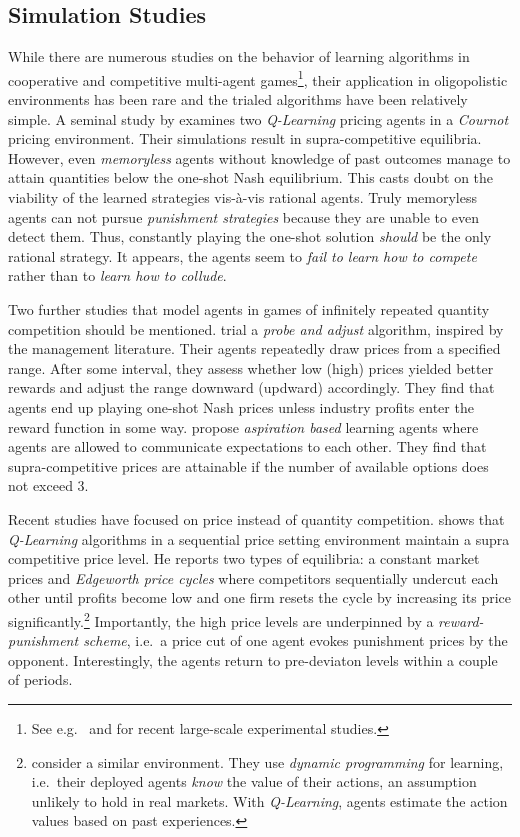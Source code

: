 \subsection{Simulation Studies}\label{simulation_studies}

While there are numerous studies on the behavior of learning algorithms in cooperative and competitive multi-agent games\footnote{See e.g.\ \textcite{leibo_multi-agent_2017} and \textcite{crandall_cooperating_2018} for recent large-scale experimental studies.}, their application in oligopolistic environments has been rare and the trialed algorithms have been relatively simple. A seminal study by \textcite{waltman_q-learning_2008} examines two \emph{Q-Learning} pricing agents in a \emph{Cournot} pricing environment. Their simulations result in supra-competitive equilibria. However, even \emph{memoryless} agents without knowledge of past outcomes manage to attain quantities below the one-shot Nash equilibrium. This casts doubt on the viability of the learned strategies vis-à-vis rational agents. Truly memoryless agents can not pursue \emph{punishment strategies} because they are unable to even detect them. Thus, constantly playing the one-shot solution \emph{should} be the only rational strategy. It appears, the agents seem to \emph{fail to learn how to compete} rather than to \emph{learn how to collude}.

Two further studies that model agents in games of infinitely repeated quantity competition should be mentioned. \textcite{kimbrough_learning_2009} trial a \emph{probe and adjust} algorithm, inspired by the management literature. Their agents repeatedly draw prices from a specified range. After some interval, they assess whether low (high) prices yielded better rewards and adjust the range downward (updward) accordingly. They find that agents end up playing one-shot Nash prices unless industry profits enter the reward function in some way. \textcite{siallagan_aspiration-based_2013} propose \emph{aspiration based} learning agents where agents are allowed to communicate expectations to each other. They find that supra-competitive prices are attainable if the number of available options does not exceed 3.

Recent studies have focused on price instead of quantity competition. \textcite{klein_autonomous_2019} shows that \emph{Q-Learning} algorithms in a sequential price setting environment maintain a supra competitive price level. He reports two types of equilibria: a constant market prices and \emph{Edgeworth price cycles} where competitors sequentially undercut each other until profits become low and one firm resets the cycle by increasing its price significantly.\footnote{\textcite{noel_edgeworth_2008} consider a similar environment. They use \emph{dynamic programming} for learning, i.e.\ their deployed agents \emph{know} the value of their actions, an assumption unlikely to hold in real markets. With \emph{Q-Learning}, agents estimate the action values based on past experiences.} Importantly, the high price levels are underpinned by a \emph{reward-punishment scheme}, i.e.\ a price cut of one agent evokes punishment prices by the opponent. Interestingly, the agents return to pre-deviaton levels within a couple of periods.

